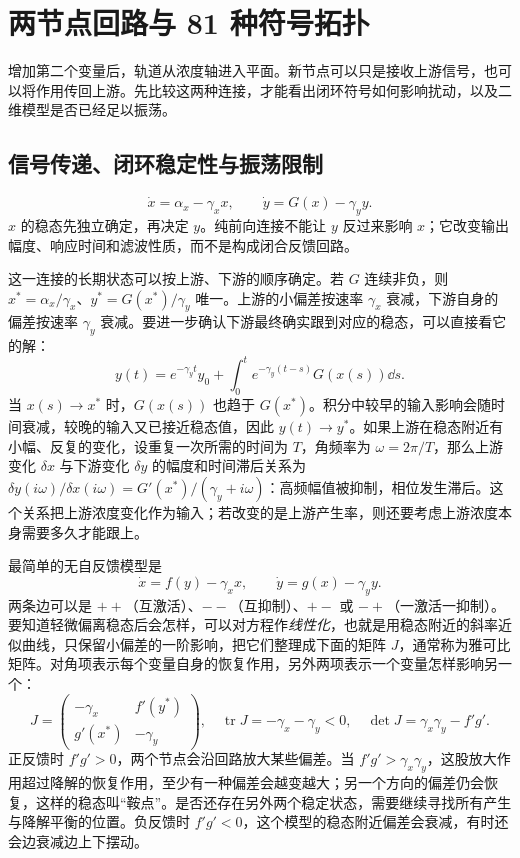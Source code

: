 \chapter{两节点回路与 81 种符号拓扑}
增加第二个变量后，轨道从浓度轴进入平面。新节点可以只是接收上游信号，也可以将作用传回上游。先比较这两种连接，才能看出闭环符号如何影响扰动，以及二维模型是否已经足以振荡。
\section{信号传递、闭环稳定性与振荡限制}
\begin{equation}\dot x=\alpha_x-\gamma_xx,\qquad\dot y=G(x)-\gamma_yy.\end{equation}
$x$ 的稳态先独立确定，再决定 $y$。纯前向连接不能让 $y$ 反过来影响 $x$；它改变输出幅度、响应时间和滤波性质，而不是构成闭合反馈回路。

这一连接的长期状态可以按上游、下游的顺序确定。若 $G$ 连续非负，则 $x^*=\alpha_x/\gamma_x$、$y^*=G(x^*)/\gamma_y$ 唯一。上游的小偏差按速率 $\gamma_x$ 衰减，下游自身的偏差按速率 $\gamma_y$ 衰减。要进一步确认下游最终确实跟到对应的稳态，可以直接看它的解：
\[
y(t)=e^{-\gamma_yt}y_0+\int_0^t e^{-\gamma_y(t-s)}G(x(s))\dd s.
\]
当 $x(s)\to x^*$ 时，$G(x(s))$ 也趋于 $G(x^*)$。积分中较早的输入影响会随时间衰减，较晚的输入又已接近稳态值，因此 $y(t)\to y^*$。如果上游在稳态附近有小幅、反复的变化，设重复一次所需的时间为 $T$，角频率为 $\omega=2\pi/T$，那么上游变化 $\delta x$ 与下游变化 $\delta y$ 的幅度和时间滞后关系为
$\delta y(i\omega)/\delta x(i\omega)=G'(x^*)/(\gamma_y+i\omega)$：高频幅值被抑制，相位发生滞后。这个关系把上游浓度变化作为输入；若改变的是上游产生率，则还要考虑上游浓度本身需要多久才能跟上。


最简单的无自反馈模型是
\begin{equation}\dot x=f(y)-\gamma_xx,\qquad\dot y=g(x)-\gamma_yy.\label{eq:two}\end{equation}
两条边可以是 $++$（互激活）、$--$（互抑制）、$+-$ 或 $-+$（一激活一抑制）。要知道轻微偏离稳态后会怎样，可以对方程作\emph{线性化}，也就是用稳态附近的斜率近似曲线，只保留小偏差的一阶影响，把它们整理成下面的矩阵 $J$，通常称为雅可比矩阵。对角项表示每个变量自身的恢复作用，另外两项表示一个变量怎样影响另一个：
\begin{equation}J=\begin{pmatrix}-\gamma_x&f'(y^*)\\g'(x^*)&-\gamma_y\end{pmatrix},\quad \operatorname{tr}J=-\gamma_x-\gamma_y<0,\quad\det J=\gamma_x\gamma_y-f'g'.\end{equation}
正反馈时 $f'g'>0$，两个节点会沿回路放大某些偏差。当 $f'g'>\gamma_x\gamma_y$，这股放大作用超过降解的恢复作用，至少有一种偏差会越变越大；另一个方向的偏差仍会恢复，这样的稳态叫“鞍点”。是否还存在另外两个稳定状态，需要继续寻找所有产生与降解平衡的位置。负反馈时 $f'g'<0$，这个模型的稳态附近偏差会衰减，有时还会边衰减边上下摆动。

